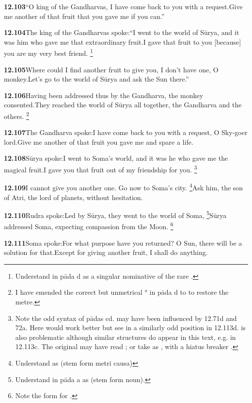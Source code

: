 \textbf{12.103}``O king of the Gandharvas, I have come back to you with a request.Give me another of that fruit that you gave me if you can.''%


\textbf{12.104}The king of the Gandharvas spoke:``I went to the world of Sūrya, and it was him who gave me that extraordinary fruit.I gave that fruit to you [because] you are my very best friend.%
\footnote{Understand  in pāda d as a singular nominative of the rare .  }%


\textbf{12.105}Where could I find another fruit to give you, I don't have one, O monkey.Let's go to the world of Sūrya and ask the Sun there.''%


\textbf{12.106}Having been addressed thus by the Gandharva, the monkey consented.They reached the world of Sūrya all together, the Gandharva and the others.%
\footnote{I have emended the correct but unmetrical ° in pāda d to  to restore the metre.  }%


\textbf{12.107}The Gandharva spoke:I have come back to you with a request, O Sky-goer lord.Give me another of that fruit you gave me and spare a life.%


\textbf{12.108}Sūrya spoke:I went to Soma's world, and it was he who gave me the magical fruit.I gave you that fruit out of my friendship for you.%
\footnote{Note the odd syntax of pādas cd.  may have been influenced                  by 12.71d and 72a. Here  would work                 better but see  in a similarly odd position in                  12.113d.  is also problematic although similar                 structures do appear in this text, e.g. in 12.113c. The original may have read                 ; or take  as ,                 with a hiatus breaker .  }%


\textbf{12.109}I cannot give you another one. Go now to Soma's city.%
\footnote{Understand  as  (stem form metri causa)  }Ask him, the son of Atri, the lord of planets, without hesitation.%


\textbf{12.110}Rudra spoke:Led by Sūrya, they went to the world of Soma,%
\footnote{Understand  in pāda a as  (stem form noun).  }Sūrya addressed Soma, expecting compassion from the Moon.%
\footnote{Note the form  for .  }%


\textbf{12.111}Soma spoke:For what purpose have you returned? O Sun, there will be a solution for that.Except for giving another fruit, I shall do anything.%


